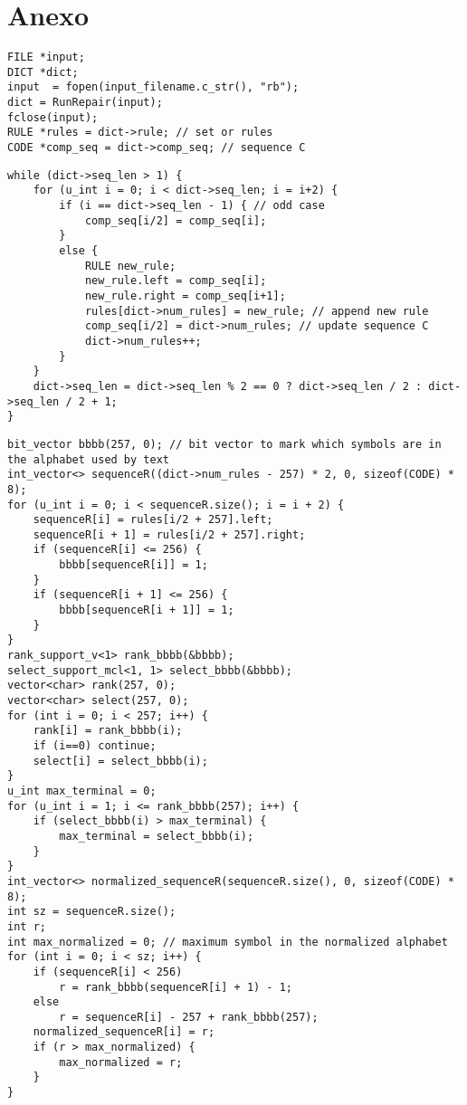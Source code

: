 \chapter{Anexo}
\begin{lstlisting}[style=cppstyle, caption={Llamando Re-Pair}, label={lst:re-pair-call}]
FILE *input;
DICT *dict;
input  = fopen(input_filename.c_str(), "rb");
dict = RunRepair(input);
fclose(input);
RULE *rules = dict->rule; // set or rules 
CODE *comp_seq = dict->comp_seq; // sequence C
\end{lstlisting}
\begin{lstlisting}[style=cppstyle, caption={Añadir más reglas hasta eliminar C}, label={lst:rule-add}]
while (dict->seq_len > 1) {
    for (u_int i = 0; i < dict->seq_len; i = i+2) {
        if (i == dict->seq_len - 1) { // odd case
            comp_seq[i/2] = comp_seq[i];
        }
        else {
            RULE new_rule;
            new_rule.left = comp_seq[i];
            new_rule.right = comp_seq[i+1];
            rules[dict->num_rules] = new_rule; // append new rule
            comp_seq[i/2] = dict->num_rules; // update sequence C
            dict->num_rules++; 
        }
    }
    dict->seq_len = dict->seq_len % 2 == 0 ? dict->seq_len / 2 : dict->seq_len / 2 + 1; 
}
\end{lstlisting} 
\begin{lstlisting}[style=cppstyle, caption={Normalizar Secuencia}, label={lst:normalizar}]
bit_vector bbbb(257, 0); // bit vector to mark which symbols are in the alphabet used by text
int_vector<> sequenceR((dict->num_rules - 257) * 2, 0, sizeof(CODE) * 8);
for (u_int i = 0; i < sequenceR.size(); i = i + 2) {
    sequenceR[i] = rules[i/2 + 257].left;
    sequenceR[i + 1] = rules[i/2 + 257].right;
    if (sequenceR[i] <= 256) {
        bbbb[sequenceR[i]] = 1;
    }
    if (sequenceR[i + 1] <= 256) {
        bbbb[sequenceR[i + 1]] = 1;
    }
}
rank_support_v<1> rank_bbbb(&bbbb);
select_support_mcl<1, 1> select_bbbb(&bbbb);
vector<char> rank(257, 0);
vector<char> select(257, 0);
for (int i = 0; i < 257; i++) {
    rank[i] = rank_bbbb(i);
    if (i==0) continue;
    select[i] = select_bbbb(i);
}
u_int max_terminal = 0;    
for (u_int i = 1; i <= rank_bbbb(257); i++) {
    if (select_bbbb(i) > max_terminal) {
        max_terminal = select_bbbb(i);
    }
}
int_vector<> normalized_sequenceR(sequenceR.size(), 0, sizeof(CODE) * 8);
int sz = sequenceR.size();
int r;
int max_normalized = 0; // maximum symbol in the normalized alphabet
for (int i = 0; i < sz; i++) {
    if (sequenceR[i] < 256) 
        r = rank_bbbb(sequenceR[i] + 1) - 1; 
    else 
        r = sequenceR[i] - 257 + rank_bbbb(257); 
    normalized_sequenceR[i] = r;
    if (r > max_normalized) {
        max_normalized = r;
    }
}
\end{lstlisting} 
